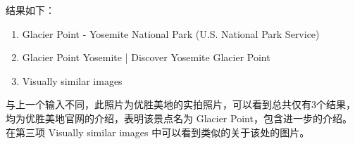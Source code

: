 \begin{homeworkProblem}
    结果如下：

    \begin{enumerate}
        \item Glacier Point - Yosemite National Park (U.S. National Park Service)
        \item Glacier Point Yosemite | Discover Yosemite Glacier Point
        \item Visually similar images
    \end{enumerate}

    与上一个输入不同，此照片为优胜美地的实拍照片，可以看到总共仅有3个结果，均为优胜美地官网的介绍，表明该景点名为 Glacier Point，包含进一步的介绍。在第三项 Visually similar images 中可以看到类似的关于该处的图片。

\end{homeworkProblem}

\pagebreak
